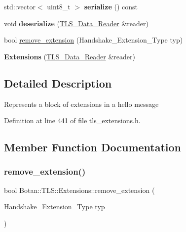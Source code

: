 \begin{DoxyCompactItemize}
std\+::vector$<$ uint8\+\_\+t $>$ {\bfseries serialize} () const
\item 
\mbox{\label{class_botan_1_1_t_l_s_1_1_extensions_aeeada6e5f3b71c9cd0fdceb594533819}} 
void {\bfseries deserialize} (\mbox{\hyperlink{class_botan_1_1_t_l_s_1_1_t_l_s___data___reader}{T\+L\+S\+\_\+\+Data\+\_\+\+Reader}} \&reader)
\item 
bool \mbox{\hyperlink{class_botan_1_1_t_l_s_1_1_extensions_a4adf35cd9f8155846e973c104e72703b}{remove\+\_\+extension}} (Handshake\+\_\+\+Extension\+\_\+\+Type typ)
\item 
\mbox{\label{class_botan_1_1_t_l_s_1_1_extensions_a34cc01c87e8ec2f49a941bedae2422bc}} 
{\bfseries Extensions} (\mbox{\hyperlink{class_botan_1_1_t_l_s_1_1_t_l_s___data___reader}{T\+L\+S\+\_\+\+Data\+\_\+\+Reader}} \&reader)
\end{DoxyCompactItemize}


\subsection{Detailed Description}
Represents a block of extensions in a hello message 

Definition at line 441 of file tls\+\_\+extensions.\+h.



\subsection{Member Function Documentation}
\mbox{\label{class_botan_1_1_t_l_s_1_1_extensions_a4adf35cd9f8155846e973c104e72703b}} 
\subsubsection{\texorpdfstring{remove\+\_\+extension()}{remove\_extension()}}
{\footnotesize\ttfamily bool Botan\+::\+T\+L\+S\+::\+Extensions\+::remove\+\_\+extension (\begin{DoxyParamCaption}\item[{Handshake\+\_\+\+Extension\+\_\+\+Type}]{typ }\end{DoxyParamCaption})}

